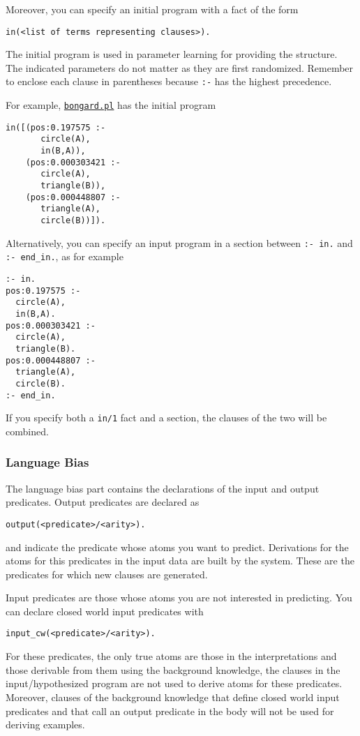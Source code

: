 Moreover, you can specify an initial program with a fact of the form 
\begin{verbatim}
in(<list of terms representing clauses>).
\end{verbatim}
The initial program is used in parameter learning for providing 
the structure. The indicated parameters do not matter as they are first randomized.
Remember to enclose each clause in parentheses because \verb|:-| has the highest precedence.

For example, \href{http://cplint.lamping.unife.it/example/bongard.pl}{\texttt{bongard.pl}} has the initial program 
\begin{verbatim}
in([(pos:0.197575 :-
       circle(A),
       in(B,A)),
    (pos:0.000303421 :-
       circle(A),
       triangle(B)), 
    (pos:0.000448807 :-
       triangle(A),
       circle(B))]).
\end{verbatim}
Alternatively, you can specify an input program in a section between \verb|:- in.| and \verb|:- end_in.|, as for example
\begin{verbatim}
:- in.
pos:0.197575 :-
  circle(A),
  in(B,A).
pos:0.000303421 :-
  circle(A),
  triangle(B).
pos:0.000448807 :-
  triangle(A),
  circle(B).
:- end_in.
\end{verbatim}
If you specify both a \verb|in/1| fact and a section, the clauses of the two will be combined.



\subsubsection{Language Bias}
%
The language bias part contains the declarations of the input and output predicates.
Output predicates are declared as
\begin{verbatim}
output(<predicate>/<arity>).
\end{verbatim}
and indicate the predicate whose atoms you want to predict. Derivations for the atoms for this predicates in the input data
are built by the system. These are the predicates for which new clauses are generated.

Input predicates are those whose atoms you are not interested in predicting. You can declare closed world input predicates with
\begin{verbatim}
input_cw(<predicate>/<arity>).
\end{verbatim}
For these predicates, the only true atoms are those in the interpretations and those derivable from them using the background knowledge, the clauses in the input/hypothesized program are not used to derive atoms for these predicates. Moreover,   clauses of the background knowledge that define closed world input predicates and that call an output predicate in the body will not be used for deriving examples.

